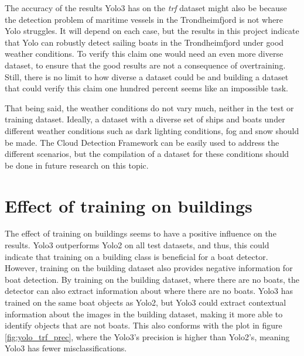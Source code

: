 \vspace{3mm}

The accuracy of the results Yolo3 has on the \textit{trf} dataset might also be because the detection problem of maritime vessels in the Trondheimfjord is not where Yolo struggles. It will depend on each case, but the results in this project indicate that Yolo can robustly detect sailing boats in the Trondheimfjord under good weather conditions. To verify this claim one would need an even more diverse dataset, to ensure that the good results are not a consequence of overtraining. Still, there is no limit to how diverse a dataset could be and building a dataset that could verify this claim one hundred percent seems like an impossible task. 

\vspace{3mm}

That being said, the weather conditions do not vary much, neither in the test or training dataset. Ideally, a dataset with a diverse set of ships and boats under different weather conditions such as dark lighting conditions, fog and snow should be made. The Cloud Detection Framework can be easily used to address the different scenarios, but the compilation of a dataset for these conditions should be done in future research on this topic.

\section{Effect of training on buildings}
The effect of training on buildings seems to have a positive influence on the results. Yolo3 outperforms Yolo2 on all test datasets, and thus, this could indicate that training on a building class is beneficial for a boat detector. However, training on the building dataset also provides negative information for boat detection. By training on the building dataset, where there are no boats, the detector can also extract information about where there are no boats. Yolo3 has trained on the same boat objects as Yolo2, but Yolo3 could extract contextual information about the images in the building dataset, making it more able to identify objects that are not boats. This also conforms with the plot in figure \ref{fig:yolo_trf_prec}, where the Yolo3's precision is higher than Yolo2's, meaning Yolo3 has fewer misclassifications.

